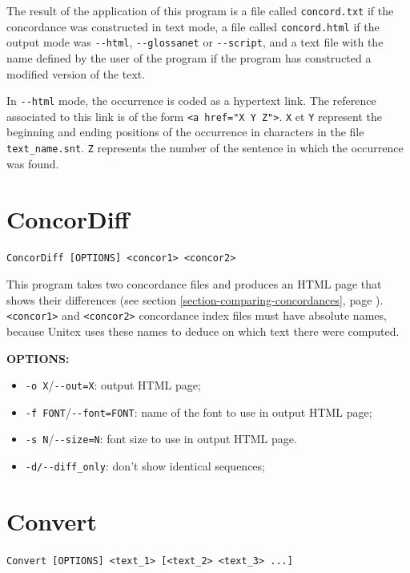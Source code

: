 \bigskip
\noindent The result of the application of this program is a file called \verb+concord.txt+
if the concordance was constructed in text mode, a file called
\verb+concord.html+ if the output mode was \verb+--html+, \verb+--glossanet+ or
\verb$--script$, and a text file with the name defined by the user of the program 
if the program has constructed a modified version of the text.

\bigskip
\noindent In \verb+--html+ mode, the occurrence is coded as a hypertext link. The reference
associated to this link is of the form \verb+<a href="X Y Z">+. \verb+X+ et
\verb+Y+ represent the beginning and ending positions of the occurrence in
characters in the file \verb+text_name.snt+. \verb+Z+ represents the number of
the sentence in which the occurrence was found.






\section{ConcorDiff}
\verb+ConcorDiff [OPTIONS] <concor1> <concor2>+

\bigskip
\noindent This program takes two concordance files and produces an HTML page
that shows their differences (see section
\ref{section-comparing-concordances}, page \pageref{section-comparing-concordances}). 
\verb+<concor1>+ and \verb+<concor2>+ concordance index files must 
have absolute names, because Unitex uses these names to deduce on which text
there were computed.

\bigskip
\noindent \textbf{OPTIONS:}
\begin{itemize}
  \item \verb+-o X+/\verb+--out=X+: output HTML page;
  \item \verb+-f FONT+/\verb+--font=FONT+: name of the font to use in output
  HTML page;
  \item \verb+-s N+/\verb+--size=N+: font size to use in output HTML page.
  \item \verb+-d/--diff_only+: don't show identical sequences;
\end{itemize}







\section{Convert}
\verb+Convert [OPTIONS] <text_1> [<text_2> <text_3> ...]+

